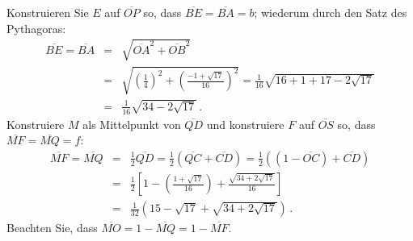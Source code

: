 Konstruieren Sie $E$ auf $\overline{OP}$ so, dass $\overline{BE}=\overline{BA}=b$; wiederum durch den Satz des Pythagoras:
\begin{eqnarray*}
\overline{BE}=\overline{BA}&=&\sqrt{\overline{OA}^2+\overline{OB}^2}\\
&=&\sqrt{\left(\frac{1}{4}\right)^2+\left(\frac{-1+\sqrt{17}}{16}\right)^2}=\frac{1}{16}\sqrt{16+1+17-2\sqrt{17}}\\
&=&\frac{1}{16}\sqrt{34-2\sqrt{17}}\,.
\end{eqnarray*}
Konstruiere $M$ als Mittelpunkt von $\overline{QD}$ und konstruiere $F$ auf $\overline{OS}$ so, dass $\overline{MF}=\overline{MQ}=f$:
\begin{eqnarray*}
\overline{MF}=\overline{MQ}&=&\frac{1}{2}\overline{QD}=\frac{1}{2}(\overline{QC}+\overline{CD})=\frac{1}{2}((1-\overline{OC})+\overline{CD})\\
&=&\frac{1}{2}\left[1-\left(\frac{1+\sqrt{17}}{16}\right)+\frac{\sqrt{34+2\sqrt{17}}}{16}\right]\\
&=&\frac{1}{32}\left(15-\sqrt{17}+\sqrt{34+2\sqrt{17}}\right)\,.
\end{eqnarray*}
Beachten Sie, dass $\overline{MO}=1-\overline{MQ}=1-\overline{MF}$.
 
